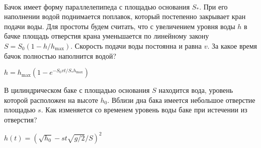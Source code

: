 \begin{ex}
\hspace{0pt} \\
\begin{minipage}{.65\textwidth}
Бачок имеет форму параллелепипеда с площадью основания $S_*$. При его наполнении водой поднимается поплавок, который постепенно закрывает кран подачи воды. Для простоты будем считать, что с увеличением уровня воды $h$ в бачке площадь отверстия крана уменьшается по линейному закону $S = S_0 (1 - h/h_{\max})$. Скорость подачи воды постоянна и равна $v$. За какое время бачок полностью наполнится водой?
\end{minipage}
\begin{minipage}{.35\textwidth}
\centering

\end{minipage}
\begin{ans}
$h = h_{\max}(1-e^{-S_0vt/S_*h_{\max}})$
\end{ans}
\end{ex}

\begin{ex}
В цилиндрическом баке с площадью основания $S$ находится вода, уровень которой расположен на высоте $h_0$. Вблизи дна бака имеется небольшое отверстие площадью $s$. Как изменяется со временем уровень воды баке при истечении из отверстия?
\begin{ans}
$h(t) = \left(\sqrt{h_0} - s t \sqrt{g/2} /S \right)^2$
\end{ans}
\end{ex}


